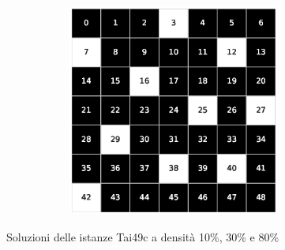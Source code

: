 \begin{figure}[h!]
\begin{subfigure}[b]{\textwidth}
\begin{subfigure}[b]{0.20\textwidth}
        \end{subfigure}
        \hspace{3em}
        \begin{subfigure}[b]{0.20\textwidth}
            \includegraphics[width=\columnwidth]{images/Tai49c_7x7_80.eps}
        \end{subfigure}
     \end{subfigure}
     \caption{Soluzioni delle istanze Tai49c a densità 10\%, 30\% e 80\%}
\end{figure}



